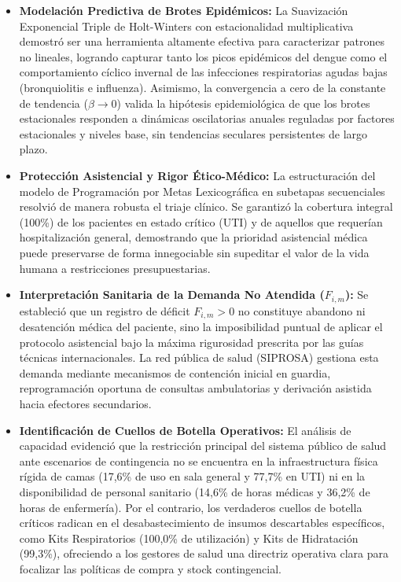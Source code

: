 \documentclass[conference]{IEEEtran}
\begin{document}
\begin{itemize}
    \item \textbf{Modelación Predictiva de Brotes Epidémicos:} La Suavización Exponencial Triple de Holt-Winters con estacionalidad multiplicativa demostró ser una herramienta altamente efectiva para caracterizar patrones no lineales, logrando capturar tanto los picos epidémicos del dengue como el comportamiento cíclico invernal de las infecciones respiratorias agudas bajas (bronquiolitis e influenza). Asimismo, la convergencia a cero de la constante de tendencia ($\beta \to 0$) valida la hipótesis epidemiológica de que los brotes estacionales responden a dinámicas oscilatorias anuales reguladas por factores estacionales y niveles base, sin tendencias seculares persistentes de largo plazo.
    \item \textbf{Protección Asistencial y Rigor Ético-Médico:} La estructuración del modelo de Programación por Metas Lexicográfica en subetapas secuenciales resolvió de manera robusta el triaje clínico. Se garantizó la cobertura integral (100\%) de los pacientes en estado crítico (UTI) y de aquellos que requerían hospitalización general, demostrando que la prioridad asistencial médica puede preservarse de forma innegociable sin supeditar el valor de la vida humana a restricciones presupuestarias.
    \item \textbf{Interpretación Sanitaria de la Demanda No Atendida ($F_{i,m}$):} Se estableció que un registro de déficit $F_{i,m} > 0$ no constituye abandono ni desatención médica del paciente, sino la imposibilidad puntual de aplicar el protocolo asistencial bajo la máxima rigurosidad prescrita por las guías técnicas internacionales. La red pública de salud (SIPROSA) gestiona esta demanda mediante mecanismos de contención inicial en guardia, reprogramación oportuna de consultas ambulatorias y derivación asistida hacia efectores secundarios.
    \item \textbf{Identificación de Cuellos de Botella Operativos:} El análisis de capacidad evidenció que la restricción principal del sistema público de salud ante escenarios de contingencia no se encuentra en la infraestructura física rígida de camas (17,6\% de uso en sala general y 77,7\% en UTI) ni en la disponibilidad de personal sanitario (14,6\% de horas médicas y 36,2\% de horas de enfermería). Por el contrario, los verdaderos cuellos de botella críticos radican en el desabastecimiento de insumos descartables específicos, como Kits Respiratorios (100,0\% de utilización) y Kits de Hidratación (99,3\%), ofreciendo a los gestores de salud una directriz operativa clara para focalizar las políticas de compra y stock contingencial.

\end{itemize}
\end{document}
